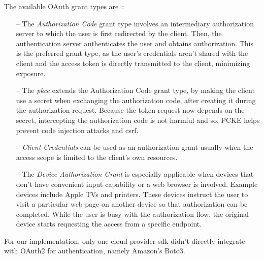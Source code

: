 The available OAuth grant types are~\cite{oauth, oauth_grants}:

\begin{itemize}
    \item [--]The \textit{Authorization Code} grant type involves an intermediary authorization server to which the user is first redirected by the client. Then, the authentication server authenticates the user and obtains authorization. This is the preferred grant type, as the user's credentials aren't shared with the client and the access token is directly transmitted to the client, minimizing exposure.

    \item [--] The \textit{\ac{pkce}} extends the Authorization Code grant type, by making the client use a secret when exchanging the authorization code, after creating it during the authorization request. Because the token request now depends on the secret, intercepting the authorization code is not harmful and so, PCKE helps prevent code injection attacks and \ac{csrf}.

    \item [--] \textit{Client Credentials} can be used as an authorization grant usually when the access scope is limited to the client's own resources.

    \item [--] The \textit{Device Authorization Grant} is especially applicable when devices that don't have convenient input capability or a web browser is involved. Example devices include Apple TVs and printers. These devices instruct the user to visit a particular web-page on another device so that authorization can be completed. While the user is busy with the authorization flow, the original device starts requesting the access from a specific endpoint.
\end{itemize}

For our implementation, only one cloud provider \ac{sdk} didn't directly integrate with OAuth2 for authentication, namely Amazon's Boto3.
